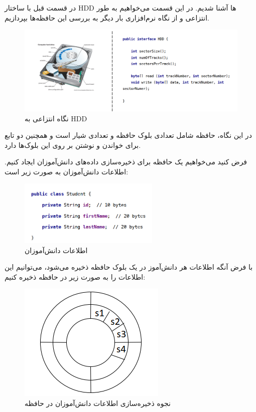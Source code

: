 \begin{flushright}
    در قسمت قبل با ساختار HDD ها آشنا شدیم.
    در این قسمت می‌خواهیم به طور انتزاعی و از نگاه نرم‌افزاری بار دیگر به بررسی این حافظه‌ها بپردازیم.

    \begin{figure}[H]
        \centering
        \includegraphics[width=\textwidth]{source/hdd-abstract-view}
        \caption{نگاه انتزاعی به HDD}
        \label{fig:hdd-abstract-view}
    \end{figure}

    در این نگاه، حافظه شامل تعدادی بلوک حافظه و تعدادی شیار است و همچنین دو تابع برای خواندن و نوشتن بر روی این بلوک‌ها دارد.

    فرض کنید می‌خواهیم یک حافظه برای ذخیره‌سازی داده‌های دانش‌آموزان ایجاد کنیم.
    اطلاعات دانش‌آموزان به صورت زیر است:

    \begin{figure}[H]
        \centering
        \includegraphics[width=0.6\textwidth]{source/student-data-model-1}
        \caption{اطلاعات دانش‌آموزان}
        \label{fig:student-data-model-1}
    \end{figure}

    با فرض آنگه اطلاعات هر دانش‌آموز در یک بلوک حافظه ذخیره می‌شود، می‌توانیم این اطلاعات را به صورت زیر در حافظه ذخیره کنیم:

    \begin{figure}[H]
        \centering
        \includegraphics[scale=1]{source/student-on-HDD}
        \caption{نجوه ذخیره‌سازی اطلاعات دانش‌آموزان در حافظه}
        \label{fig:student-on-HDD}
    \end{figure}


\end{flushright}
